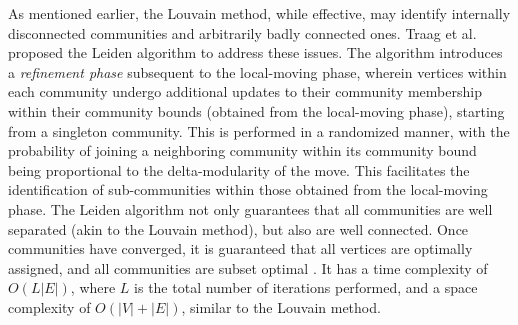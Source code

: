 As mentioned earlier, the Louvain method, while effective, may identify internally disconnected communities and arbitrarily badly connected ones. Traag et al. \cite{com-traag19} proposed the Leiden algorithm to address these issues. The algorithm introduces a \textit{refinement phase} subsequent to the local-moving phase, wherein vertices within each community undergo additional updates to their community membership within their community bounds (obtained from the local-moving phase), starting from a singleton community. This is performed in a randomized manner, with the probability of joining a neighboring community within its community bound being proportional to the delta-modularity of the move. This facilitates the identification of sub-communities within those obtained from the local-moving phase. The Leiden algorithm not only guarantees that all communities are well separated (akin to the Louvain method), but also are well connected. Once communities have converged, it is guaranteed that all vertices are optimally assigned, and all communities are subset optimal \cite{com-traag19}. It has a time complexity of $O (L |E|)$, where $L$ is the total number of iterations performed, and a space complexity of $O(|V| + |E|)$, similar to the Louvain method.
